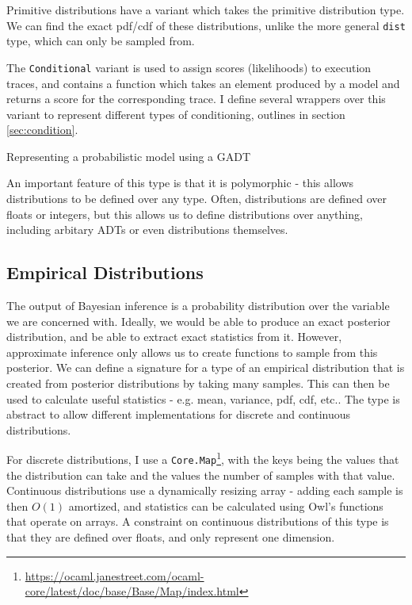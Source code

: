 Primitive distributions have a variant which takes the primitive distribution type. We can find the exact pdf/cdf of these distributions, unlike the more general \texttt{dist} type, which can only be sampled from.

The \texttt{Conditional} variant is used to assign scores (likelihoods) to execution traces, and contains a function which takes an element produced by a model and returns a score for the corresponding trace. I define several wrappers over this variant to represent different types of conditioning, outlines in section \ref{sec:condition}.

\begin{listing}[!ht]
	\caption{Representing a probabilistic model using a GADT}
	\label{lst:gadt1}
\end{listing}

An important feature of this type is that it is polymorphic - this allows distributions to be defined over any type. Often, distributions are defined over floats or integers, but this allows us to define distributions over anything, including arbitary ADTs or even distributions themselves.

\subsection{Empirical Distributions}

The output of Bayesian inference is a probability distribution over the variable we are concerned with. Ideally, we would be able to produce an exact posterior distribution, and be able to extract exact statistics from it. However, approximate inference only allows us to create functions to sample from this posterior. We can define a signature for a type of an empirical distribution that is created from posterior distributions by taking many samples. This can then be used to calculate useful statistics - e.g. mean, variance, pdf, cdf, etc.. The type is abstract to allow different implementations for discrete and continuous distributions. 
	
For discrete distributions, I use a \texttt{Core.Map}\footnote{\url{https://ocaml.janestreet.com/ocaml-core/latest/doc/base/Base/Map/index.html}}, with the keys being the values that the distribution can take and the values the number of samples with that value. Continuous distributions use a dynamically resizing array - adding each sample is then $O(1)$ amortized, and statistics can be calculated using Owl's functions that operate on arrays. A constraint on continuous distributions of this type is that they are defined over floats, and only represent one dimension.
	
